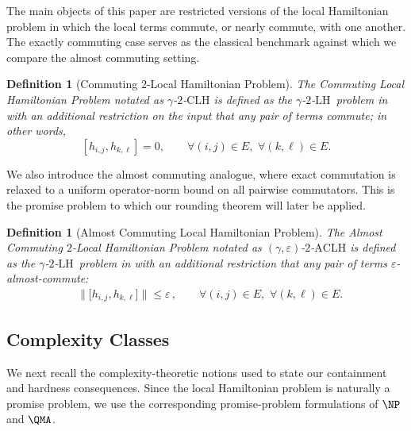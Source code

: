 \documentclass[a4paper,onecolumn,11pt]{quantumarticle}
\theoremstyle{plain}
\newtheorem{definition}[theorem]{Definition}
\newcommand{\eps}{\varepsilon}
\newcommand{\kLH}{$\gamma$-$2$-$\mathrm{LH}$}
\begin{document}
The main objects of this paper are restricted versions of the local Hamiltonian problem in which the local terms commute, or nearly commute, with one another.  The exactly commuting case serves as the classical benchmark against which we compare the almost commuting setting.

\begin{definition}[Commuting $2$-Local Hamiltonian Problem]
    The Commuting Local Hamiltonian Problem notated as $\gamma$-$2$-$\mathrm{CLH}$ is defined as the \kLH\ problem in  with an additional restriction on the input that any pair of terms commute; in other words,
    \begin{equation}
    \left[h_{i, j}, h_{k, \ell}\right] = 0, \quad\quad \forall (i, j) \in E, \,\, \forall (k, \ell) \in E.
    \end{equation}
\end{definition}

We also introduce the almost commuting analogue, where exact commutation is relaxed to a uniform operator-norm bound on all pairwise commutators.  This is the promise problem to which our rounding theorem will later be applied.

\begin{definition}[Almost Commuting Local Hamiltonian Problem]
The Almost Commuting $2$-Local Hamiltonian Problem notated as $(\gamma, \eps)$-$2$-$\mathrm{ACLH}$ is defined as the \kLH\ problem in  with an additional restriction that any pair of terms $\eps$-almost-commute:
\begin{align}
\,\,\,\, \|\big[h_{i, j}, h_{k, \ell}\big]\| \leq \eps \, , \quad\quad \forall (i, j) \in E, \,\, \forall (k, \ell) \in E.
\end{align}
\end{definition}

\subsection{Complexity Classes}

We next recall the complexity-theoretic notions used to state our containment and hardness consequences.  Since the local Hamiltonian problem is naturally a promise problem, we use the corresponding promise-problem formulations of $\NP$ and $\QMA$.
\end{document}
